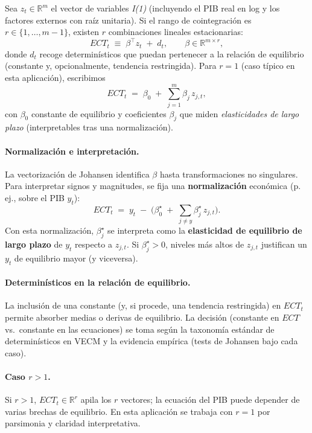 \documentclass[11pt,a4paper]{article}
\newcommand{\1}{\mathbf{1}}
\begin{document}
Sea $z_t \in \mathbb{R}^m$ el vector de variables \emph{I(1)} (incluyendo el PIB real en log y los factores externos con raíz unitaria). 
Si el rango de cointegración es $r \in \{1,\dots,m-1\}$, existen $r$ combinaciones lineales estacionarias:
\begin{equation}
\label{eq:ect_def}
ECT_t \;\equiv\; \beta^\top z_t \;+\; d_t,
\qquad
\beta \in \mathbb{R}^{m \times r},
\end{equation}
donde $d_t$ recoge determinísticos que puedan pertenecer a la relación de equilibrio (constante y, opcionalmente, tendencia restringida). 
Para $r=1$ (caso típico en esta aplicación), escribimos
\[
ECT_t \;=\; \beta_0 \;+\; \sum_{j=1}^m \beta_j\, z_{j,t},
\]
con $\beta_0$ constante de equilibrio y coeficientes $\beta_j$ que miden \emph{elasticidades de largo plazo} (interpretables tras una normalización).

\paragraph{Normalización e interpretación.}
La vectorización de Johansen identifica $\beta$ hasta transformaciones no singulares. 
Para interpretar signos y magnitudes, se fija una \textbf{normalización} económica (p.\,ej., sobre el PIB $y_t$):
\[
ECT_t \;=\; y_t \;-\; \Big( \beta_0^\star \;+\; \sum_{j \neq y} \beta_j^\star\, z_{j,t} \Big).
\]
Con esta normalización, $\beta_j^\star$ se interpreta como la \textbf{elasticidad de equilibrio de largo plazo} de $y_t$ respecto a $z_{j,t}$.
Si $\beta_j^\star > 0$, niveles más altos de $z_{j,t}$ justifican un $y_t$ de equilibrio mayor (y viceversa).

\paragraph{Determinísticos en la relación de equilibrio.}
La inclusión de una constante (y, si procede, una tendencia restringida) en $ECT_t$ permite absorber medias o derivas de equilibrio. 
La decisión (constante en $ECT$ vs.\ constante en las ecuaciones) se toma según la taxonomía estándar de determinísticos en VECM y la evidencia empírica (tests de Johansen bajo cada caso).

\paragraph{Caso $r>1$.}
Si $r>1$, $ECT_t \in \mathbb{R}^r$ apila los $r$ vectores; la ecuación del PIB puede depender de varias brechas de equilibrio. 
En esta aplicación se trabaja con $r=1$ por parsimonia y claridad interpretativa.
\end{document}
